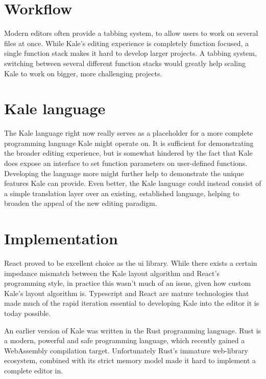 \section{Workflow}
Modern editors often provide a tabbing system, to allow
users to work on several files at once. While Kale's editing experience
is completely function focused, a single function stack makes it hard
to develop larger projects. A tabbing system, switching between several
different function stacks would greatly help scaling Kale to work on bigger,
more challenging projects.

\section{Kale language}
The Kale language right now really serves as a placeholder for a more complete
programming language Kale might operate on.
It is sufficient for demonstrating the broader editing experience, but is somewhat
hindered by the fact that Kale does expose an interface to set function parameters
on user-defined functions. Developing the language more might further help to
demonstrate the unique features Kale can provide. Even better, the Kale language
could instead consist of a simple translation layer over an existing, established
language, helping to broaden the appeal of the new editing paradigm. 


\section{Implementation}
React proved to be excellent choice as the \ac{ui} library. While there exists a
certain impedance mismatch between the Kale layout algorithm and React's programming
style, in practice this wasn't much of an issue, given how custom Kale's layout
algorithm is. Typescript and React are mature technologies that made much of
the rapid iteration essential to developing Kale into the editor it is today possible.

An earlier version of Kale was written in the Rust programming language. Rust is a
modern, powerful and safe programming language, which recently gained a WebAssembly
compilation target. Unfortunately Rust's immature web-library ecosystem,
combined with its strict memory model made it hard to implement a complete editor in.
